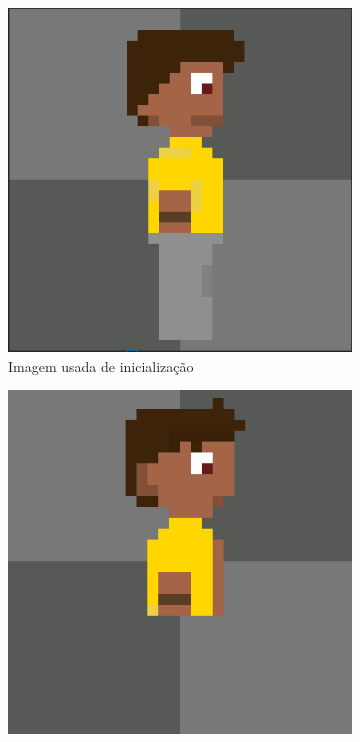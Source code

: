 \begin{figure}[htbp]
\begin{subfigure}{0.32\linewidth}
        \includegraphics[width=1\linewidth]{figs/pixelLab/dia2/fix_init_1.PNG}
        \caption{\small Imagem usada de inicialização}
        \label{fig:pixelLabRotacao11b}
    \end{subfigure}
    \begin{subfigure}{0.32\linewidth}
        \includegraphics[width=1\linewidth]{figs/pixelLab/dia2/rot45fix3init1res3.PNG}

\end{subfigure}
\end{figure}
